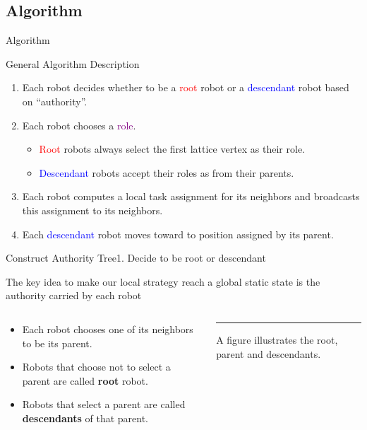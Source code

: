 \documentclass[10pt]{beamer}
\begin{document}
\subsection{Algorithm}
\begin{frame}{Algorithm}
  \begin{block}{General Algorithm Description}
    \begin{enumerate}
    \item<1-> Each robot decides whether to be a \textcolor{red}{root}
      robot or a \textcolor{blue}{descendant} robot based on ``authority''.
      
    \item<2-> Each robot chooses a \textcolor{purple}{role}. 
      \begin{itemize}
      \item \textcolor{red}{Root} robots always select the
        first lattice vertex as their role.  
      \item \textcolor{blue}{Descendant} robots accept
        their roles as from their parents.
      \end{itemize}    
      
    \item<3-> Each robot computes a local task assignment for
      its neighbors and broadcasts this assignment to its neighbors.
      
    \item<4-> Each \textcolor{blue}{descendant} robot moves toward to
      position assigned by its parent.
    \end{enumerate}
  \end{block}
\end{frame}

\begin{frame}{Construct Authority Tree}{1. Decide to be root or descendant}
  \begin{block}{The key idea to make our local strategy reach a global static
    state is the authority carried by each robot}
    \begin{columns}[T] %
      \begin{column}{.5\textwidth}
        \begin{itemize}
        \item Each robot chooses one of its neighbors to be its
          parent.
        \item Robots that choose not to select a parent are
          called \textbf{root} robot.
        \item Robots that select a parent are called
          \textbf{descendants} of that parent. 
        \end{itemize} 
      \end{column}%
      \begin{column}{.4\textwidth}
        \color{blue}\rule{\linewidth}{4pt}

        A figure illustrates the root, parent and descendants.
      \end{column}%
    \end{columns}
   \end{block} 
\end{frame}
\end{document}
